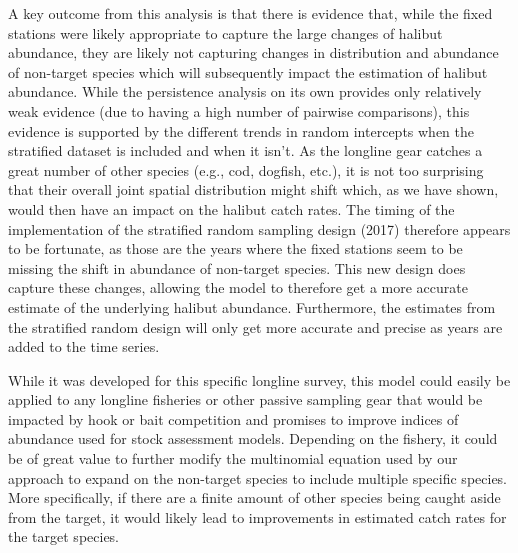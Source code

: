 \documentclass[12pt]{article}\usepackage[]{graphicx}\usepackage[]{color}
\begin{document}
A key outcome from this analysis is that there is evidence that, while the fixed stations were likely appropriate to capture the large changes of halibut abundance, they are likely not capturing changes in distribution and abundance of non-target species which will subsequently impact the estimation of halibut abundance. While the persistence analysis on its own provides only relatively weak evidence (due to having a high number of pairwise comparisons), this evidence is supported by the different trends in random intercepts when the stratified dataset is included and when it isn't. As the longline gear catches a great number of other species (e.g., cod, dogfish, etc.), it is not too surprising that their overall joint spatial distribution might shift which, as we have shown, would then have an impact on the halibut catch rates. The timing of the implementation of the stratified random sampling design (2017) therefore appears to be fortunate, as those are the years where the fixed stations seem to be missing the shift in abundance of non-target species. This new design does capture these changes, allowing the model to therefore get a more accurate estimate of the underlying halibut abundance. Furthermore, the estimates from the stratified random design will only get more accurate and precise as years are added to the time series.

While it was developed for this specific longline survey, this model could easily be applied to any longline fisheries or other passive sampling gear that would be impacted by hook or bait competition and promises to improve indices of abundance used for stock assessment models. Depending on the fishery, it could be of great value to further modify the multinomial equation used by our approach to expand on the non-target species to include multiple specific species. More specifically, if there are a finite amount of other species being caught aside from the target, it would likely lead to improvements in estimated catch rates for the target species.
\end{document}
